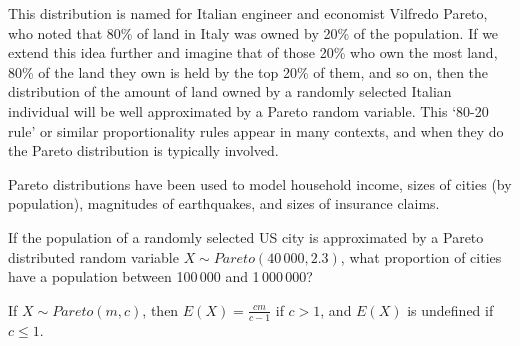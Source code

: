 \par
This distribution is named for Italian engineer and economist Vilfredo Pareto, who noted that 80\% of land in Italy was owned by 20\% of the population. If we extend this idea further and imagine that of those 20\% who own the most land, 80\% of the land they own is held by the top 20\% of them, and so on, then the distribution of the amount of land owned by a randomly selected Italian individual will be well approximated by a Pareto random variable. This `80-20 rule' or similar proportionality rules appear in many contexts, and when they do the Pareto distribution is typically involved.
\par
Pareto distributions have been used to model household income, sizes of cities (by population), magnitudes of earthquakes, and sizes of insurance claims. %
\par
\begin{examp} If the population of a randomly selected US city is approximated by a Pareto distributed random variable $X \sim Pareto(40\,000,2.3)$, what proportion of cities have a population between 100\,000 and 1\,000\,000?
\end{examp}
\begin{prop} If $X \sim Pareto(m,c)$, then $E(X) = \frac{cm}{c-1}$ if $c > 1$, and $E(X)$ is undefined if $c \leq 1$.
\end{prop}
